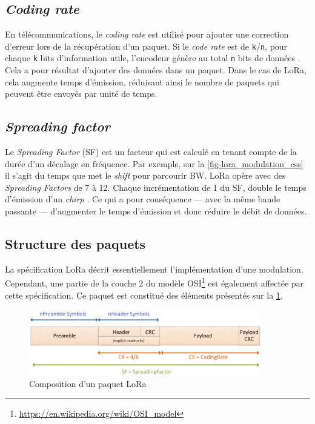 \subsection{\textit{Coding rate}}

En télécommunications, le \textit{coding rate} est utilisé pour ajouter une correction d'erreur lors de la récupération d'un paquet. Si le \textit{code rate} est de \texttt{k}/\texttt{n}, pour chaque \texttt{k} bits d'information utile, l'encodeur génère au total \texttt{n} bits de données \cite{Coderate2:online}. Cela a pour résultat d'ajouter des données dans un paquet. Dans le cas de LoRa, cela augmente temps d'émission, réduisant ainsi le nombre de paquets qui peuvent être envoyés par unité de temps. 

\subsection{\textit{Spreading factor}}
\label{sec-stateoftheart_lora_spread_factor}

Le \textit{Spreading Factor} (SF) est un facteur qui est calculé en tenant compte de la durée d'un décalage en fréquence. Par exemple, sur la \cref{fig-lora_modulation_css} il s'agit du temps que met le \textit{shift} pour parcourir BW. LoRa opère avec des \textit{Spreading Factors} de 7 à 12. Chaque incrémentation de 1 du SF, double le temps d'émission d'un \textit{chirp} \cite{Explorat95:online}. Ce qui a pour conséquence --- avec la même bande passante --- d'augmenter le temps d'émission et donc réduire le débit de données.


\subsection{Structure des paquets}

La spécification LoRa décrit essentiellement l'implémentation d'une modulation. Cependant, une partie de la couche 2 du modèle OSI\footnote{\url{https://en.wikipedia.org/wiki/OSI_model}} est également affectée par cette spécification. 
Ce paquet est constitué des éléments présentés sur la \cref{fig-lora_packet}. 
\begin{figure}[ht!]
    \centering
    \includegraphics[width=0.9\textwidth]{Figures/StateOfTheArt/lora_packet.png}
    \caption{Composition d'un paquet LoRa}
    \label{fig-lora_packet}
\end{figure}

